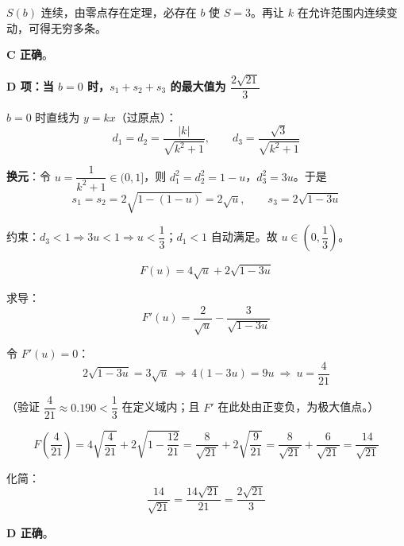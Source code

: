 \begin{answer}
$S(b)$ 连续，由零点存在定理，必存在 $b$ 使 $S=3$。再让 $k$ 在允许范围内连续变动，可得无穷多条。

 \textbf{C 正确}。

\par\medskip

\textbf{D 项：当 $b=0$ 时，$s_1+s_2+s_3$ 的最大值为 $\dfrac{2\sqrt{21}}{3}$}

$b=0$ 时直线为 $y=kx$（过原点）：
\nopagebreak[4]
\[d_1=d_2=\frac{|k|}{\sqrt{k^2+1}},\qquad d_3=\frac{\sqrt3}{\sqrt{k^2+1}}\]

\textbf{换元}：令 $u=\dfrac{1}{k^2+1}\in(0,1]$，则 $d_1^2=d_2^2=1-u$，$d_3^2=3u$。于是
\nopagebreak[4]
\[s_1=s_2=2\sqrt{1-(1-u)}=2\sqrt u,\qquad s_3=2\sqrt{1-3u}\]

约束：$d_3<1\Rightarrow 3u<1\Rightarrow u<\dfrac13$；$d_1<1$ 自动满足。故 $u\in\left(0,\dfrac13\right)$。

\nopagebreak[4]
\[F(u)=4\sqrt u+2\sqrt{1-3u}\]

求导：
\nopagebreak[4]
\[F'(u)=\frac{2}{\sqrt u}-\frac{3}{\sqrt{1-3u}}\]

令 $F'(u)=0$：
\nopagebreak[4]
\[2\sqrt{1-3u}=3\sqrt u\ \Longrightarrow\ 4(1-3u)=9u\ \Longrightarrow\ u=\frac{4}{21}\]

（验证 $\dfrac{4}{21}\approx0.190<\dfrac13$  在定义域内；且 $F'$ 在此处由正变负，为极大值点。）

\nopagebreak[4]
\[F\left(\frac4{21}\right)=4\sqrt{\frac4{21}}+2\sqrt{1-\frac{12}{21}}=\frac{8}{\sqrt{21}}+2\sqrt{\frac{9}{21}}=\frac{8}{\sqrt{21}}+\frac{6}{\sqrt{21}}=\frac{14}{\sqrt{21}}\]

化简：
\nopagebreak[4]
\[\frac{14}{\sqrt{21}}=\frac{14\sqrt{21}}{21}=\frac{2\sqrt{21}}{3}\]

 \textbf{D 正确}。


\par\medskip

\end{answer}

